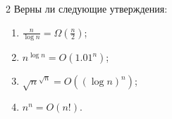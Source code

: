 \begin{task}{2}
    Верны ли следующие утверждения:
    \begin{enumerate}
        \item $ \displaystyle{\frac{n}{\log n} = \Omega\!\left(\frac{n}{2}\right)} $;

        \item $ \displaystyle{n^{\log n} = O\!\left(1.01^n\right)} $;

        \item $ \displaystyle{\sqrt{n}^{\sqrt{n}} = O\!\left(\left(\log n\right)^n\right)} $;

        \item $ \displaystyle{n^n = O\!\left(n!\right)} $.
    \end{enumerate}
\end{task}

